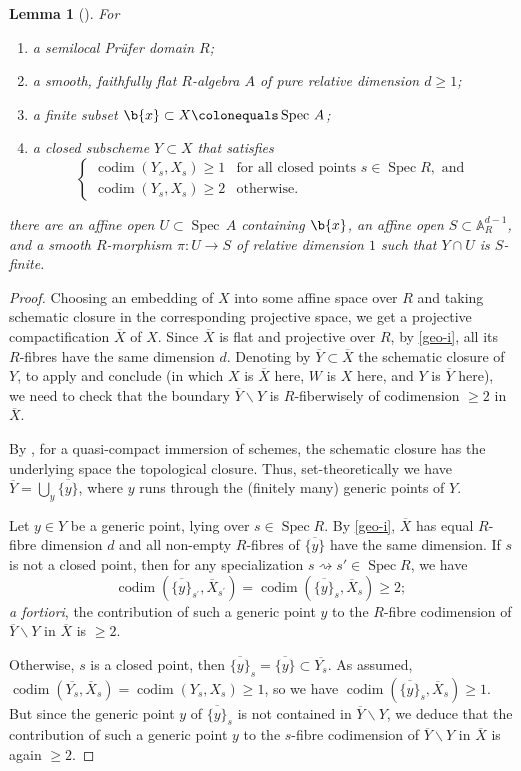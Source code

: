 \documentclass[JEP,XML,SOM,Unicode,published]{cedram}
\newenvironment{enumeratei}
{\bgroup\def\theenumi{\roman{enumi}}\def\theenumii{\arabic{enumii}}\begin{enumerate}}
{\end{enumerate}\egroup}
\let\backslash\smallsetminus
\let\ov\overline
\let\ce\colonequals
\newcommand{\pr}{^{\prime}}
\let\specializes\rightsquigarrow
\DeclareMathOperator{\Spec}{Spec}
\DeclareMathOperator{\codim}{codim}
\newcommand{\bpf}{\begin{proof}}
\newcommand{\epf}{\end{proof}}
\newcommand{\blemt}{\begin{lemma-tweak}}
\newcommand{\elemt}{\end{lemma-tweak}}
\newcommand{\benumr}{\begin{enumeratei}}
\newcommand{\eenumr}{\end{enumeratei}}
\providecommand{\SP}[1]{\cite[\href{https://stacks.math.columbia.edu/tag/#1}{#1}]{SP}}
\theoremstyle{plain}
\newtheorem{lemma-tweak}[subsection]{Lemma}
\theoremstyle{definition}
\begin{document}
\blemt [{\cf \cite[Prop.\,4.1]{Ces22a}}] \label{geome. input}
For
\benumr
\item a semilocal Prüfer domain $R$;
\item a smooth, faithfully flat $R$-algebra $A$ of pure relative dimension $d\ge 1$;
\item a finite subset $\b{x}\subset X\ce \Spec\, A$;
\item a closed subscheme $Y\subset X$ that satisfies
\[
\begin{cases}
\codim(Y_s, X_s)\geq 1 & \text{for all closed points }s\in \Spec R, \text{ and} \\
\codim(Y_s,X_s)\geq 2 & \text{otherwise}.
\end{cases}
\]
\eenumr
\noindent
there are an affine open $U\subset \Spec\, A$ containing $\b{x}$, an affine open $S\subset \mathbb{A}_R^{d-1}$, and a smooth $R$-morphism $\pi:U\to S$ of relative dimension $1$ such that $Y\cap U$ is $S$-finite.
\elemt
\bpf
Choosing an embedding of $X$ into some affine space over $R$ and taking schematic closure in the corresponding projective space, we get a projective compactification $\overline{X}$ of $X$. Since $\overline{X}$ is flat and projective over $R$, by \eqref{geo-i}, all its $R$-fibres have the same dimension $d$. Denoting by $\overline{Y} \subset \overline{X}$ the schematic closure of $Y$,
to apply {} and conclude (in which $X$ is $\overline{X}$ here, $W$ is $X$ here, and $Y$ is $\overline{Y}$ here), we need to check that
the boundary $\overline{Y}\backslash Y$ is $R$-fiberwisely of codimension $\ge 2$ in $\overline{X}$.

By \SP{01RG}, for a quasi-compact immersion of schemes, the schematic closure has the underlying space the topological closure. Thus, set-theoretically we have $\overline{Y}=\bigcup_y \overline{\{y\}}$, where $y$ runs through the (finitely many) generic points of $Y$.

Let $y\in Y$ be a generic point, lying over $s\in \Spec R$.
By \eqref{geo-i}, $\overline{X}$ has equal $R$-fibre dimension $d$ and all non-empty $R$-fibres of $\overline{\{y\}}$ have the same dimension. If $s$ is not a closed point, then for any specialization $s\specializes s'\in \Spec R$, we have
\[
\codim(\ov{\{y\}}_{s\pr}, \overline{X}_{s\pr})= \codim(\ov{\{y\}}_{s}, \overline{X}_{s})\geq 2;
\]
\emph{a fortiori}, the contribution of such a generic point $y$ to the $R$-fibre codimension of $\overline{Y}\backslash Y$ in $\overline{X}$ is $\ge 2$.

Otherwise, $s$ is a closed point, then $\overline{\{y\}}_{s} =\overline{\{y\}} \subset \overline{Y_{s}}$.
As assumed, $\codim(\overline{Y_{s}},\overline{X}_{s})=\codim(Y_{s},X_{s})\geq 1$, so we have $\codim(\overline{\{y\}}_{s}, \overline{X}_{s}) \ge 1$. But since the generic point $y$ of $\overline{\{y\}}_{s}$ is not contained in $ \overline{Y}\backslash Y$, we deduce that the contribution of such a generic point $y$ to the $s$-fibre codimension of $\overline{Y}\backslash Y$ in $\overline{X}$ is again $\ge 2$.
\epf
\end{document}
